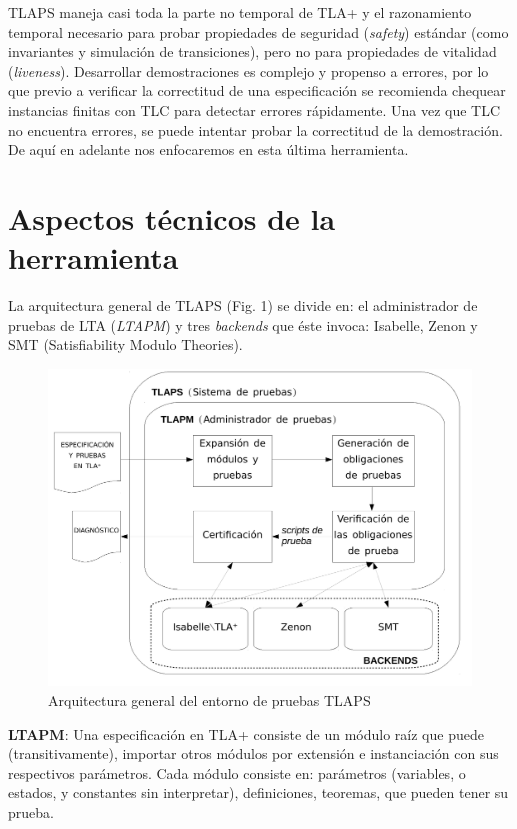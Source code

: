 \documentclass[spanish]{llncs}
\begin{document}
\begin{itemize}
	  TLAPS maneja casi toda la parte no temporal de TLA+ y el razonamiento temporal necesario para probar propiedades de seguridad (\textit{safety}) estándar (como invariantes y simulación de transiciones), pero no para propiedades de vitalidad (\textit{liveness}).
	  Desarrollar demostraciones es complejo y propenso a errores, por lo que previo a verificar la correctitud de una especificación
	  se recomienda chequear instancias finitas con TLC para detectar errores rápidamente. 
	  Una vez que TLC no encuentra errores, se puede intentar probar la correctitud de la demostración.
	  De aquí en adelante nos enfocaremos en esta última herramienta. 
  \end{itemize}

\section{Aspectos técnicos de la herramienta}
La arquitectura general de TLAPS (Fig. 1) se divide en: el administrador de pruebas de LTA (\textit{LTAPM}) y tres \textit{backends} que éste invoca: Isabelle, Zenon y SMT (Satisfiability Modulo Theories).

\begin{figure}
  \includegraphics[scale=0.4]{esquema-informe-ingsoft2}
  \caption{Arquitectura general del entorno de pruebas TLAPS}
\end{figure}

  \textbf{LTAPM}: Una especificación en TLA+ consiste de un módulo raíz que puede (transitivamente), importar otros módulos por extensión e instanciación con
  sus respectivos parámetros. Cada módulo consiste en: parámetros (variables, o estados, y constantes sin interpretar), definiciones, teoremas, que pueden tener su prueba.
  
\end{document}
